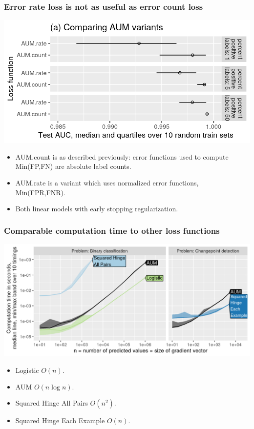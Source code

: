 \documentclass{beamer}
\begin{document}
\begin{frame}
  \frametitle{Error rate loss is not as useful as error count loss}

 \includegraphics[width=\textwidth]{figure-unbalanced-grad-desc-aum.png}

 \begin{itemize}
 \item AUM.count is as described previously: error functions used to
   compute Min(FP,FN) are absolute label counts.
 \item AUM.rate is a variant which uses normalized error functions,
   Min(FPR,FNR).
 \item Both linear models with early stopping regularization.
 \end{itemize}

\end{frame}

\begin{frame}
  \frametitle{Comparable computation time to other loss functions}

\includegraphics[width=\textwidth]{figure-aum-grad-speed-both.png}

\begin{itemize}
\item Logistic $O(n)$.
\item AUM $O(n\log n)$.
\item Squared Hinge All Pairs $O(n^2)$.
\item Squared Hinge Each Example $O(n)$.
\end{itemize}
  
\end{frame}
\end{document}
